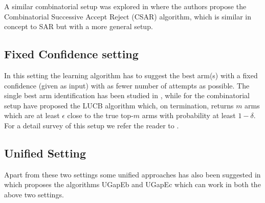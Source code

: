 	A similar combinatorial setup was explored in \citet{chen2014combinatorial} where the authors propose the Combinatorial Successive Accept Reject (CSAR) algorithm, which is similar in concept to SAR but with a more general setup. 

 
\subsection{Fixed Confidence setting} 

In this setting the learning algorithm has to suggest the best arm(s) with a fixed confidence (given as input) with as fewer number of attempts as possible. The single best arm identification has been studied in \citet{even2006action}, while for the combinatorial setup \citet{kalyanakrishnan2012pac} have proposed the LUCB algorithm which, on termination, returns  $m$ arms which are at least $\epsilon$ close to the true top-$m$ arms with probability at least $1-\delta$. For a detail survey of this setup we refer the reader to \citet{jamieson2014best}. 

\subsection{Unified Setting}
Apart from these two settings some unified approaches has also been suggested in \citet{gabillon2012best} which proposes the algorithms UGapEb and UGapEc which can work in both the above two settings. 



	
	
